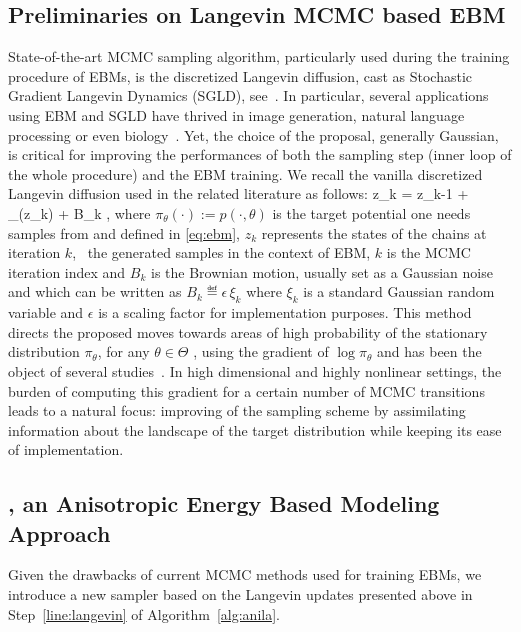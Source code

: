 \documentclass{article} %
\begin{document}
\subsection{Preliminaries on Langevin MCMC based EBM}
State-of-the-art MCMC sampling algorithm, particularly used during the training procedure of EBMs, is the discretized Langevin diffusion, cast as Stochastic Gradient Langevin Dynamics (SGLD), see~\citet{welling2011bayesian}.
In particular, several applications using EBM and SGLD have thrived in image generation, natural language processing or even biology~\cite{du2019energy}.
Yet, the choice of the proposal, generally Gaussian, is critical for improving the performances of both the sampling step (inner loop of the whole procedure) and the EBM training.
We recall the vanilla discretized Langevin diffusion used in the related literature as follows:
\beq\notag
z_k = z_{k-1} +  \nabla \log \pi_\theta(z_k) + \sqrt{\gamma} B_k \eqsp,
\eeq
where $\pi_\theta(\cdot):= p(\cdot,\theta)$ is the target potential one needs samples from and defined in \eqref{eq:ebm}, $z_k$ represents the states of the chains at iteration $k$, \ie\ the generated samples in the context of EBM, $k$ is the MCMC iteration index and $B_k$ is the Brownian motion, usually set as a Gaussian noise and which can be written as $B_k \eqdef \epsilon \, \xi_k$ where $\xi_k$ is a standard Gaussian random variable and $\epsilon$ is a scaling factor for implementation purposes.
This method directs the proposed moves towards areas of high probability of the stationary distribution $\pi_\theta$, for any $\theta \in \Theta$ , using the gradient of $\log \pi_{\theta}$ and has been the object of several studies~\cite{girolami2011riemann,cotter2013mcmc}.
In high dimensional and highly nonlinear settings, the burden of computing this gradient for a certain number of MCMC transitions leads to a natural focus: improving of the sampling scheme by assimilating information about the landscape of the target distribution while keeping its ease of implementation.

\subsection{\algo, an Anisotropic Energy Based Modeling Approach}

Given the drawbacks of current MCMC methods used for training EBMs, we introduce a new sampler based on the Langevin updates presented above in Step~\ref{line:langevin} of Algorithm~\ref{alg:anila}.
\end{document}
